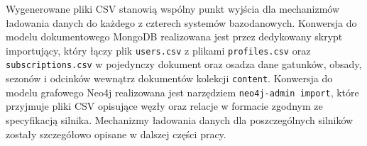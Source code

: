 Wygenerowane pliki CSV stanowią wspólny punkt wyjścia dla mechanizmów
ładowania danych do każdego z czterech systemów bazodanowych. Konwersja
do modelu dokumentowego MongoDB realizowana jest przez dedykowany skrypt
importujący, który łączy plik \texttt{users.csv} z plikami \texttt{profiles.csv}
oraz \texttt{subscriptions.csv} w pojedynczy dokument oraz osadza dane
gatunków, obsady, sezonów i odcinków wewnątrz dokumentów kolekcji
\texttt{content}. Konwersja do modelu grafowego Neo4j realizowana jest
narzędziem \texttt{neo4j-admin import}, które przyjmuje pliki CSV
opisujące węzły oraz relacje w formacie zgodnym ze specyfikacją silnika.
Mechanizmy ładowania danych dla poszczególnych silników zostały szczegółowo
opisane w dalszej części pracy.
